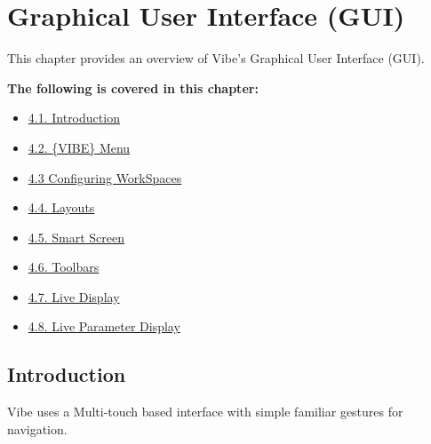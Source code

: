 \documentclass[
]{article}
\providecommand{\tightlist}{%
  \setlength{\itemsep}{0pt}\setlength{\parskip}{0pt}}
\begin{document}
\hypertarget{graphical-user-interface-gui}{%
\section{Graphical User Interface (GUI)}\label{graphical-user-interface-gui}}

This chapter provides an overview of Vibe's Graphical User Interface (GUI).

\textbf{The following is covered in this chapter:}

\begin{itemize}
\tightlist
\item
  \href{https://vibemanual.compulite.com/graphical-user-interface-gui.html\#introduction-1}{4.1. Introduction}
\item
  \href{https://vibemanual.compulite.com/graphical-user-interface-gui.html\#vibe-menu}{4.2. \{VIBE\} Menu}
\item
  \href{https://vibemanual.compulite.com/graphical-user-interface-gui.html\#configuring-workspaces}{4.3 Configuring WorkSpaces}
\item
  \href{https://vibemanual.compulite.com/graphical-user-interface-gui.html\#layouts}{4.4. Layouts}
\item
  \href{https://vibemanual.compulite.com/graphical-user-interface-gui.html\#smart-screen}{4.5. Smart Screen}
\item
  \href{https://vibemanual.compulite.com/graphical-user-interface-gui.html\#toolbars}{4.6. Toolbars}
\item
  \href{https://vibemanual.compulite.com/graphical-user-interface-gui.html\#live-display}{4.7. Live Display}
\item
  \href{https://vibemanual.compulite.com/graphical-user-interface-gui.html\#live-parameter-display}{4.8. Live Parameter Display}
\end{itemize}

\hypertarget{introduction-1}{%
\subsection{Introduction}\label{introduction-1}}

Vibe uses a Multi-touch based interface with simple familiar gestures for navigation.
\end{document}
